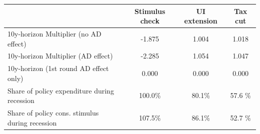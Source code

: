\begin{tabular}{@{}lccc@{}} 
\toprule 
& Stimulus check    & UI extension    & Tax cut     \\  \midrule 
10y-horizon Multiplier (no AD effect) &-1.875  & 1.004  & 1.018     \\ 
10y-horizon Multiplier (AD effect) &-2.285  & 1.054  & 1.047     \\ 
10y-horizon (1st round AD effect only) &0.000  & 0.000  & 0.000     \\ 
Share of policy expenditure during recession &100.0\%  & 80.1\%  & 57.6 \%    \\ 
Share of policy cons. stimulus during recession &107.5\%  & 86.1\%  & 52.7 \%    \\ \bottomrule 
\end{tabular}  
